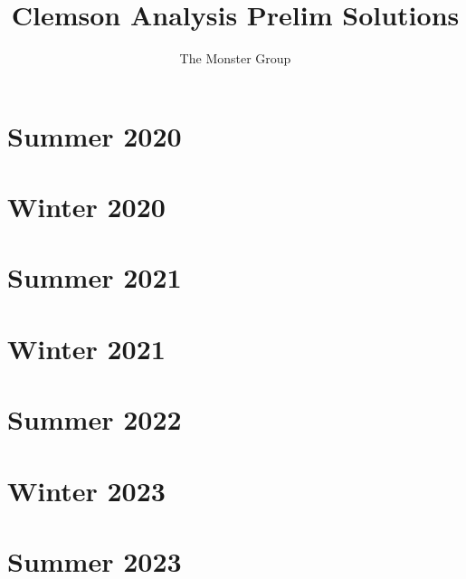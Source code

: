 \documentclass[12pt]{article}
\title{Clemson Analysis Prelim Solutions}
\author{The Monster Group}
\begin{document}
\maketitle

\tableofcontents

\newpage
\section{Summer 2020}\label{sec:s20}


\newpage
\section{Winter 2020}\label{sec:w20}


\newpage
\section{Summer 2021}\label{sec:s21}


\newpage
\section{Winter 2021}\label{sec:w21}


\newpage
\section{Summer 2022}\label{sec:s22}


\newpage
\section{Winter 2023}\label{sec:w23}


\newpage
\section{Summer 2023}\label{sec:s23}

\end{document}
